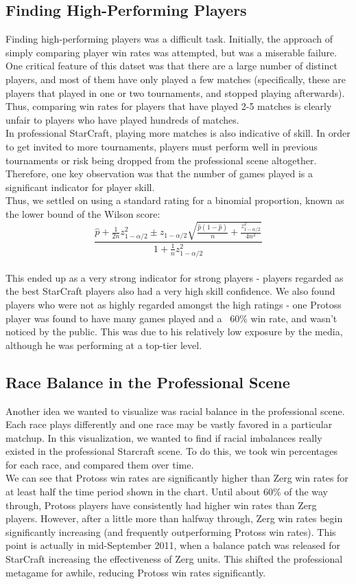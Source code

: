 \subsection{Finding High-Performing Players}
Finding high-performing players was a difficult task.  Initially, the approach of simply comparing player win rates was attempted, but was a miserable failure.  One critical feature of this datset was that there are a large number of distinct players, and most of them have only played a few matches (specifically, these are players that played in one or two tournaments, and stopped playing afterwards).  Thus, comparing win rates for players that have played 2-5 matches is clearly unfair to players who have played hundreds of matches.\\
In professional StarCraft, playing more matches is also indicative of skill.  In order to get invited to more tournaments, players must perform well in previous tournaments or risk being dropped from the professional scene altogether.  Therefore, one key observation was that the number of games played is a significant indicator for player skill.\\
Thus, we settled on using a standard rating for a binomial proportion, known as the lower bound of the Wilson score:
\[
\frac{{ {\hat p + \frac{{1}}{{2n}}
 z_{1- \alpha / 2}^2  \pm z_{1- \alpha / 2}
\sqrt {\frac{{\hat p\left( {1 - \hat p} \right)}}{n} + \frac{{z_{1- \alpha / 2}^2}}
{{4n^2}} }} }}
{{ {1 + \frac{{1}}{n}} z_{1- \alpha / 2}^2 }}
\]\\
This ended up as a very strong indicator for strong players - players regarded as the best StarCraft players also had a very high skill confidence.  We also found players who were not as highly regarded amongst the high ratings - one Protoss player was found to have many games played and a ~60\% win rate, and wasn't noticed by the public.  This was due to his relatively low exposure by the media, although he was performing at a top-tier level.

\subsection{Race Balance in the Professional Scene}
Another idea we wanted to visualize was racial balance in the professional scene.  Each race plays differently and one race may be vastly favored in a particular matchup.  In this visualization, we wanted to find if racial imbalances really existed in the professional Starcraft scene.  To do this, we took win percentages for each race, and compared them over time.\\

We can see that Protoss win rates are significantly higher than Zerg win rates for at least half the time period shown in the chart.  Until about 60\% of the way through, Protoss players have consistently had higher win rates than Zerg players.  However, after a little more than halfway through, Zerg win rates begin significantly increasing (and frequently outperforming Protoss win rates).  This point is actually in mid-September 2011, when a balance patch was released for StarCraft increasing the effectiveness of Zerg units.  This shifted the professional metagame for awhile, reducing Protoss win rates significantly.
